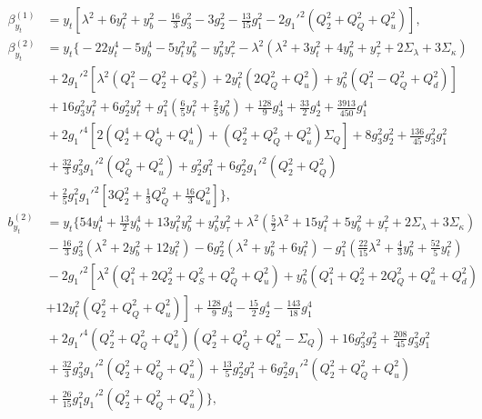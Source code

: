 \documentclass[preprint,amsmath,amssymb,aps,superscriptaddress,prd,showpacs,floatfix,nofootinbib]{revtex4-1}
\begin{document}
\begin{subequations}
\begin{align}
\beta_{y_t}^{(1)}&=y_t\left [ \lambda^2+6y_t^2+y_b^2-\frac{16}{3}g_3^2-3g_2^2-\frac{13}{15}g_1^2-2g_1'^2\left ( Q_2^2+Q_Q^2+Q_u^2 \right )\right ],\label{eq:USSMYu22BetaOneLoop}\\
\beta_{y_t}^{(2)}&=y_t\bigg \{-22y_t^4-5y_b^4-5y_t^2y_b^2-y_b^2y_\tau^2-\lambda^2 \left ( \lambda^2+3y_t^2+4y_b^2+y_\tau^2+2\Sigma_\lambda + 3\Sigma_\kappa\right )\nonumber\\
&{}+2g_1'^2\left [ \lambda^2\left ( Q_1^2-Q_2^2+Q_S^2 \right )+2y_t^2\left ( 2Q_Q^2+Q_u^2\right )+y_b^2\left ( Q_1^2-Q_Q^2+Q_d^2\right )\right ]\nonumber\\
&{}+16g_3^2y_t^2+6g_2^2y_t^2+g_1^2\left ( \frac{6}{5}y_t^2+\frac{2}{5}y_b^2\right )+\frac{128}{9}g_3^4+\frac{33}{2}g_2^4+\frac{3913}{450}g_1^4\nonumber\\
&{}+2g_1'^4\left [ 2\left ( Q_2^4+Q_Q^4+Q_u^4\right )+\left ( Q_2^2+Q_Q^2+Q_u^2\right )\Sigma_{Q}\right ]+8g_3^2g_2^2+\frac{136}{45}g_3^2g_1^2\nonumber\\
&{}+\frac{32}{3}g_3^2g_1'^2\left ( Q_Q^2+Q_u^2\right )+g_2^2g_1^2+6g_2^2g_1'^2\left ( Q_2^2+Q_Q^2\right )\nonumber\\
&{}+\frac{2}{5}g_1^2g_1'^2\left [ 3Q_2^2+\frac{1}{3}Q_Q^2+\frac{16}{3}Q_u^2\right ]\bigg \},\label{eq:USSMYu22BetaTwoLoop}\\
b_{y_t}^{(2)}&=y_t\bigg \{ 54y_t^4+\frac{13}{2}y_b^4+13y_t^2y_b^2+y_b^2y_\tau^2+\lambda^2\left ( \frac{5}{2}\lambda^2+15y_t^2+5y_b^2+y_\tau^2+2\Sigma_\lambda+3\Sigma_\kappa \right )\nonumber\\
&{}-\frac{16}{3}g_3^2\left ( \lambda^2+2y_b^2+12y_t^2\right )-6g_2^2\left ( \lambda^2+y_b^2+6y_t^2\right )-g_1^2\left ( \frac{22}{15}\lambda^2+\frac{4}{3}y_b^2+\frac{52}{5}y_t^2\right )\nonumber\\
&{}-2g_1'^2\left [ \lambda^2 \left (Q_1^2+2Q_2^2+Q_S^2+Q_Q^2+Q_u^2 \right )+y_b^2\left ( Q_1^2+Q_2^2+2Q_Q^2+Q_u^2+Q_d^2\right )\right.\nonumber\\
&{}\left.+12y_t^2\left ( Q_2^2+Q_Q^2+Q_u^2\right )\right ]+\frac{128}{9}g_3^4-\frac{15}{2}g_2^4-\frac{143}{18}g_1^4\nonumber\\
&{}+2g_1'^4\left ( Q_2^2+Q_Q^2+Q_u^2\right )\left ( Q_2^2+Q_Q^2+Q_u^2-\Sigma_{Q}\right )+16g_3^2g_2^2+\frac{208}{45}g_3^2g_1^2\nonumber\\
&{}+\frac{32}{3}g_3^2g_1'^2\left ( Q_2^2+Q_Q^2+Q_u^2\right )+\frac{13}{5}g_2^2g_1^2+6g_2^2g_1'^2\left ( Q_2^2+Q_Q^2+Q_u^2 \right )\nonumber\\
&{}+\frac{26}{15}g_1^2g_1'^2\left ( Q_2^2+Q_Q^2+Q_u^2 \right )\bigg \},\label{eq:USSMYu22Ot2Coeff}
\end{align}
\end{subequations}
\end{document}
